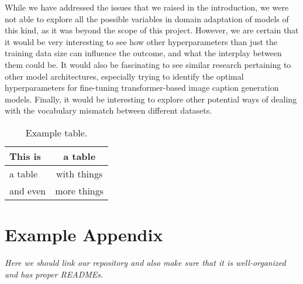 \documentclass[11pt]{article}
\begin{document}
While we have addressed the issues that we raised in the introduction, we were not able to explore all the possible variables in domain adaptation of models of this kind, as it was beyond the scope of this project. However, we are certain that it would be very interesting to see how other hyperparameters than just the training data size can influence the outcome, and what the interplay between them could be. It would also be fascinating to see similar research pertaining to other model architectures, especially trying to identify the optimal hyperparameters for fine-tuning transformer-based image caption generation models. Finally, it would be interesting to explore other potential ways of dealing with the vocabulary mismatch between different datasets.

\begin{table}
\centering
\begin{tabular}{lc}
\hline
\textbf{This is} & \textbf{a table}\\
\hline
a table & with things \\
and even & more things  \\\hline
\end{tabular}
\caption{Example table.}
\label{tab:accents}
\end{table}



\appendix

\section{Example Appendix}
\label{sec:appendix}

\textit{Here we should link our repository and also make sure that it is well-organized and has proper READMEs.}
\end{document}
